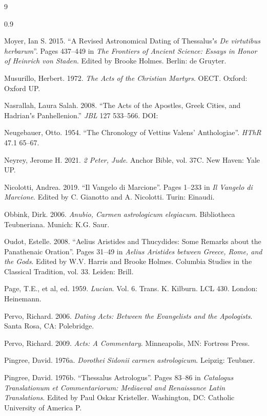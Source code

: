 \begin{thebibliography}{9}
\begin{spacing}{0.9}
\begin{small}
Moyer, Ian S. 2015. 
“A Revised Astronomical Dating of Thessalusʼs \textit{De virtutibus herbarum}”. %
Pages 437--449 in \textit{The Frontiers of Ancient Science: Essays in Honor of Heinrich von Staden}. %
Edited by Brooke Holmes. %
Berlin: de Gruyter. %

Musurillo, Herbert. 1972. %
\textit{The Acts of the Christian Martyrs}. %
OECT. Oxford: Oxford UP. %

Nasrallah, Laura Salah. 2008. %
“The Acts of the Apostles, Greek Cities, and Hadrianʼs Panhellenion.” %
\textit{JBL} 127 533--566. %
DOI:  %

Neugebauer, Otto. 1954. %
“The Chronology of Vettius Valens’ Anthologiae”. %
\textit{HThR} 47.1 65--67. %

Neyrey, Jerome H. 2021. %
\textit{2 Peter, Jude}. %
Anchor Bible, vol. 37C. %
New Haven: Yale UP. %

Nicolotti, Andrea. 2019. %
“Il Vangelo di Marcione”. %
Pages 1--233 in \textit{Il Vangelo di Marcione}. %
Edited by C. Gianotto and A. Nicolotti. %
Turin: Einaudi. %

Obbink, Dirk. 2006. %
\textit{Anubio, Carmen astrologicum elegiacum}. %
Bibliotheca Teubneriana. %
Munich: K.G. Saur. %

Oudot, Estelle. 2008. %
“Aelius Aristides and Thucydides: %
Some Remarks about the Panathenaic Oration”. %
Pages 31--49 in \textit{Aelius Aristides between Greece, Rome, and the Gods}. %
Edited by W.V. Harris and Brooke Holmes. %
Columbia Studies in the Classical Tradition, vol. 33. %
Leiden: Brill. %

Page, T.E., et al, ed. 1959. %
\textit{Lucian}. Vol. 6. %
Trans. K. Kilburn. %
LCL 430. %
London: Heinemann. %

Pervo, Richard. 2006. \textit{Dating Acts: %
Between the Evangelists and the Apologists}. %
Santa Rosa, CA: Polebridge. %

Pervo, Richard. 2009. \textit{Acts: A Commentary}. %
Minneapolis, MN: Fortress Press. %

Pingree, David. 1976a. %
\textit{Dorothei Sidonii carmen astrologicum}. %
Leipzig: Teubner. %

Pingree, David. 1976b. %
“Thessalus Astrologus”. %
Pages 83--86 in \textit{Catalogus Translationum et Commentariorum: Mediaeval and Renaissance Latin Translations}. %
Edited by Paul Oskar Kristeller. %
Washington, DC: Catholic University of America P. %


\end{small}
\end{spacing}
\end{thebibliography}

